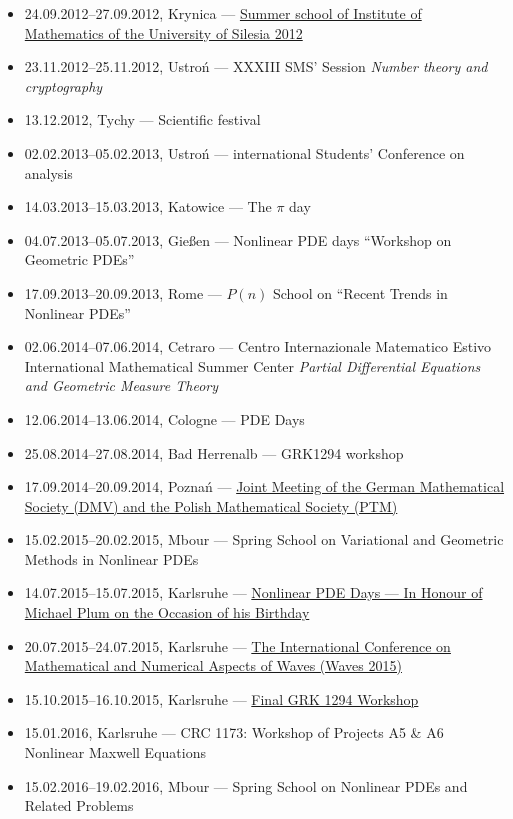 \begin{itemize}
  \item 24.09.2012--27.09.2012, Krynica --- \href{http://www.math.us.edu.pl/lsim2012/index.html}{Summer school of Institute of Mathematics of the University of Silesia 2012}
  \item 23.11.2012--25.11.2012, Ustroń --- XXXIII SMS' Session \textsl{Number theory and cryptography}
  \item 13.12.2012, Tychy --- Scientific festival
  \item 02.02.2013--05.02.2013, Ustroń ---  international Students' Conference on analysis
  \item 14.03.2013--15.03.2013, Katowice --- The $\pi$ day
  \item 04.07.2013--05.07.2013, Gießen --- Nonlinear PDE days ``Workshop on Geometric PDEs''
  \item 17.09.2013--20.09.2013, Rome --- $P(n)$ School on ``Recent Trends in Nonlinear PDEs''
  \item 02.06.2014--07.06.2014, Cetraro ---  Centro Internazionale Matematico Estivo International Mathematical Summer Center \textit{Partial Differential Equations and Geometric Measure Theory}
  \item 12.06.2014--13.06.2014, Cologne --- PDE Days
  \item 25.08.2014--27.08.2014, Bad Herrenalb --- GRK1294 workshop
  \item 17.09.2014--20.09.2014, Poznań --- \href{http://ptm-dmv.wmi.amu.edu.pl/}{Joint Meeting of the German Mathematical Society (DMV) and the Polish Mathematical Society (PTM)}
  \item 15.02.2015--20.02.2015, Mbour --- Spring School on Variational and Geometric Methods in Nonlinear PDEs
  \item 14.07.2015--15.07.2015, Karlsruhe --- \href{https://www.math.kit.edu/iana2/event/nonl. pde days/en}{Nonlinear PDE Days --- In Honour of Michael Plum on the Occasion of his  Birthday}
  \item 20.07.2015--24.07.2015, Karlsruhe --- \href{http://waves2015.math.kit.edu/}{The  International Conference on Mathematical and Numerical Aspects of Waves (Waves 2015)}
  \item 15.10.2015--16.10.2015, Karlsruhe --- \href{https://www.math.kit.edu/grk1294/page/finalws/}{Final GRK 1294 Workshop}
  \item 15.01.2016, Karlsruhe --- CRC 1173: Workshop of Projects A5 \& A6 Nonlinear Maxwell Equations
  \item 15.02.2016--19.02.2016, Mbour --- Spring School on Nonlinear PDEs and Related Problems

\end{itemize}
